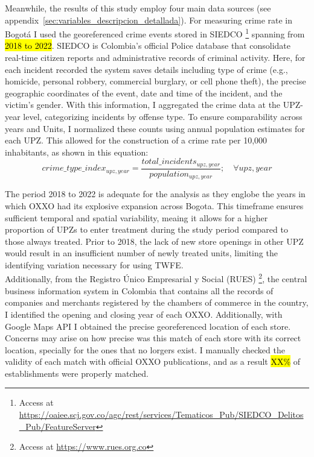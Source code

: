\documentclass[12pt]{article}
\begin{document}
Meanwhile, the results of this study employ four main data sources (see appendix~\ref{sec:variables_descripcion_detallada}).
For measuring crime rate in Bogotá I used the georeferenced crime events stored in SIEDCO \footnote{Access at \url{ https://oaiee.scj.gov.co/agc/rest/services/Tematicos_Pub/SIEDCO_Delitos_Pub/FeatureServer}} spanning from \hl{2018 to 2022}. 
SIEDCO is Colombia’s official Police database that consolidate real-time citizen reports and administrative records of criminal activity. Here, for each incident recorded the system saves details including type of crime (e.g., homicide, personal robbery, commercial burglary, or cell phone theft), the precise geographic coordinates of the event, date and time of the incident, and the victim’s gender. 
With this information, I aggregated the crime data at the UPZ-year level, categorizing incidents by offense type. To ensure comparability across years and Units, I normalized these counts using annual population estimates for each UPZ. This allowed for the construction of a crime rate per 10,000 inhabitants, as shown in this equation:\\

\begin{equation}
crime\_type\_index_{upz,year}=\frac{total\_incidents_{upz,year}}{population_{upz,year}} ; \quad \forall upz,year
\end{equation}

The period 2018 to 2022 is adequate for the analysis as they englobe the years in which OXXO had its explosive expansion across Bogota. 
This timeframe ensures sufficient temporal and spatial variability, meaing it allows for a higher proportion of UPZs to enter treatment during the study period compared to those always treated. 
Prior to 2018, the lack of new store openings in other UPZ would result in an insufficient number of newly treated units, limiting the identifying variation necessary for using TWFE.\\ 

Additionally, from the Registro Único Empresarial y Social (RUES) \footnote{Access at \url{ https://www.rues.org.co}}, the central business information system in Colombia that contains all the records of companies and merchants registered by the chambers of commerce in the country, I identified the opening and closing year of each OXXO. 
Additionally, with Google Maps API I obtained the precise georeferenced location of each store. Concerns may arise on how precise was this match of each store with its correct location, specially for the ones that no lorgers exist. 
I manually checked the validity of each match with official OXXO publications, and as a result \hl{XX\%} of establishments were properly matched.\\ 
\end{document}
